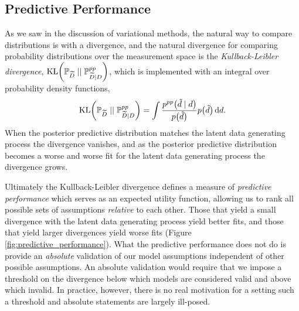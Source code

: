 \subsection{Predictive Performance}

As we saw in the discussion of variational methods, the
natural way to compare distributions is with a divergence,
and the natural divergence for comparing probability
distributions over the measurement space is the
\emph{Kullback-Leibler divergence}, 
$\mathrm{KL} \! \left( 
 \mathbb{P}_{\widetilde{D}} \mid\mid \mathbb{P}_{\widetilde{D} \mid D}^{pp} \right)$,
%
which is implemented with an integral over probability density 
functions,
%
\begin{equation*}
\mathrm{KL} \! \left( \mathbb{P}_{\widetilde{D}} \mid\mid 
\mathbb{P}_{\widetilde{D} \mid D}^{pp} \right)
= \int 
\frac{p^{pp} \! \left( \tilde{d} \mid d \right)}{p \! \left( \tilde{d} \right)}
p \! \left( \tilde{d} \right) \mathrm{d} d.
\end{equation*}
%
When the posterior predictive distribution matches the
latent data generating process the divergence vanishes,
and as the posterior predictive distribution becomes a
worse and worse fit for the latent data generating process
the divergence grows.

Ultimately the Kullback-Leibler divergence defines a
measure of \emph{predictive performance} which serves
as an expected utility function, allowing us to rank all possible 
sets of assumptions \emph{relative} to each other.  Those that 
yield a small divergence with the latent data generating process
yield better fits, and those that yield larger divergences yield
worse fits (Figure \ref{fig:predictive_performance}).  What the 
predictive performance does not do is provide an \emph{absolute} 
validation of our model assumptions independent of other 
possible assumptions.  An absolute validation would require 
that we impose a threshold on the divergence below which 
models are considered valid and above which invalid.  In 
practice, however, there is no real motivation for a setting 
such a threshold and absolute statements are largely ill-posed.

